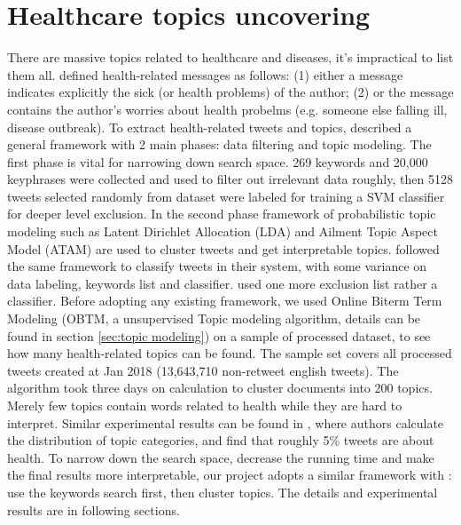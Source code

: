 \section{Healthcare topics uncovering}
\label{sec:uncoverig}
There are massive topics related to healthcare and diseases, it's impractical to list them all. \cite{tuarob2013discovering} defined health-related messages as follows: (1) either a message indicates explicitly the sick (or health problems) of the author; (2) or the message contains the author's worries about health probelms (e.g. someone else falling ill, disease outbreak). To extract health-related tweets and topics, \cite{paul2014discovering, paul2011you} described a general framework with 2 main phases: data filtering and topic modeling. The first phase is vital for narrowing down search space. 269 keywords and 20,000 keyphrases were collected and used to filter out irrelevant data roughly, then 5128 tweets selected randomly from dataset were labeled for training a SVM classifier for deeper level exclusion. In the second phase framework of probabilistic topic modeling such as Latent Dirichlet Allocation (LDA) and Ailment Topic Aspect Model (ATAM) are used to cluster tweets and get interpretable topics. \cite{serban2019real,sadilek2012modeling} followed the same framework to classify tweets in their system, with some variance on data labeling, keywords list and classifier. \cite{elkin2017network} used one more exclusion list rather a classifier. Before adopting any existing framework, we used Online Biterm Term Modeling (OBTM, a unsupervised Topic modeling algorithm, details can be found in section \ref{sec:topic modeling}) on a sample of processed dataset, to see how many health-related topics can be found. The sample set covers all processed tweets created at Jan 2018 (13,643,710 non-retweet english tweets). The algorithm took three days on calculation to cluster documents into 200 topics. Merely few topics contain words related to health while they are hard to interpret. Similar experimental results can be found in \cite{zhao2011comparing}, where authors calculate the distribution of topic categories, and find that roughly 5\% tweets are about health. To narrow down the search space, decrease the running time and make the final results more interpretable, our project adopts a similar framework with \cite{paul2014discovering}: use the keywords search first, then cluster topics. The details and experimental results are in following sections.

